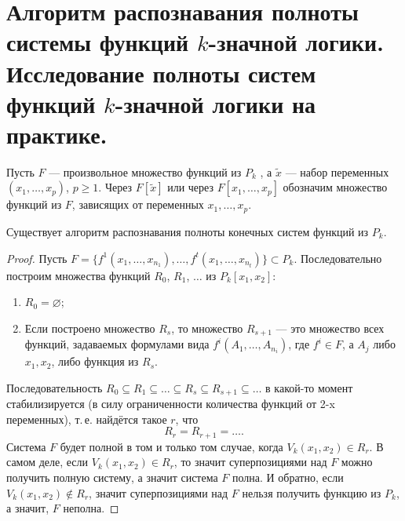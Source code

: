 \section{Алгоритм распознавания полноты системы функций $k$-значной логики. Исследование полноты систем функций $k$-значной логики на практике.}

\begin{definition}
    Пусть $F$ --- произвольное множество функций из $P_k$ , а $\widetilde{x}$ --- набор переменных $(x_1, \ldots, x_p)$, $p \geqslant 1$. Через $F[\widetilde{x}]$ или через $F[x_1, \ldots, x_p]$ обозначим множество функций из $F$, зависящих от переменных $x_1, \ldots, x_p$.
\end{definition}

\begin{theorem}
    Существует алгоритм распознавания полноты конечных систем функций из $P_k$.
\end{theorem}

\begin{proof}
    Пусть $F = \{f^1(x_1, \ldots, x_{n_1}), \ldots, f^t(x_1,\ldots, x_{n_t})\} \subset P_k$. Последовательно построим множества функций $R_0$, $R_1$, $\ldots$ из $P_k[x_1, x_2]$:
    \begin{enumerate}
        \item $R_0 = \varnothing$;
        \item Если построено множество $R_s$, то множество $R_{s+1}$ --- это множество всех функций, задаваемых формулами вида $f^i(A_1, \ldots, A_{n_i})$, где $f^i \in F$, а $A_j$ либо $x_1, x_2$, либо функция из $R_s$. 
    \end{enumerate}
    Последовательность $R_0 \subseteq R_1 \subseteq \ldots \subseteq R_s \subseteq R_{s+1} \subseteq \ldots $ в какой-то момент стабилизируется (в силу ограниченности количества функций от 2-x переменных), т.\,е. найдётся такое $r$, что 
    \[
        R_r = R_{r+1} = \ldots.
    \]
    Система $F$ будет полной в том и только том случае, когда $V_k(x_1, x_2) \in R_r$. В самом деле, если $V_k(x_1, x_2) \in R_r$, то значит суперпозициями над $F$ можно получить полную систему, а значит система $F$ полна. И обратно, если $V_k(x_1, x_2) \notin R_r$, значит суперпозициями над $F$ нельзя получить функцию из $P_k$, а значит, $F$ неполна.
\end{proof}